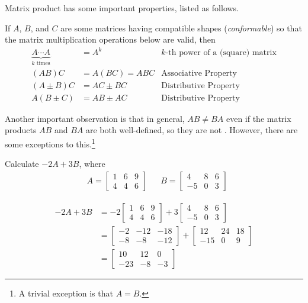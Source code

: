 Matrix product has some important properties, listed as follows.
\begin{proper}
\label{proper:matmul}
If $A$, $B$, and $C$ are some matrices having compatible shapes (\textit{conformable}) so that the matrix multiplication operations below are valid, then
\begin{align*}
\underbrace{A\cdots A}_{k \text{ times}} &= A^k &\text{$k$-th power of a (square) matrix} \\
(AB)C &= A(BC) = ABC &\text{Associative Property} \\
(A \pm B)C &= AC \pm BC &\text{Distributive Property} \\
A(B \pm C) &= AB \pm AC &\text{Distributive Property}
\end{align*}
\end{proper}
Another important observation is that in general, $AB \neq BA$ even if the matrix products $AB$ and $BA$ are both well-defined, so they are not . However, there are some exceptions to this.\footnote{A trivial exception is that $A=B$.}
\begin{exmp}
Calculate $-2A + 3B$, where
\begin{align*}
& A = 
\begin{bmatrix}
1 & 6 & 9 \\
4 & 4 & 6 
\end{bmatrix} &
& B = 
\begin{bmatrix}
4 & 8 & 6 \\
-5 & 0 & 3
\end{bmatrix}
\end{align*}
\end{exmp}
\begin{solution}
\begin{align*}
-2A + 3B &= 
-2\begin{bmatrix}
1 & 6 & 9 \\
4 & 4 & 6 
\end{bmatrix}
+3\begin{bmatrix}
4 & 8 & 6 \\
-5 & 0 & 3
\end{bmatrix} \\
&= \begin{bmatrix}
-2 & -12 & -18 \\
-8 & -8 & -12 
\end{bmatrix}
+ \begin{bmatrix}
12 & 24 & 18 \\
-15 & 0 & 9
\end{bmatrix} \\
&= \begin{bmatrix}
10 & 12 & 0 \\
-23 & -8 & -3
\end{bmatrix}
\end{align*}
\end{solution}

